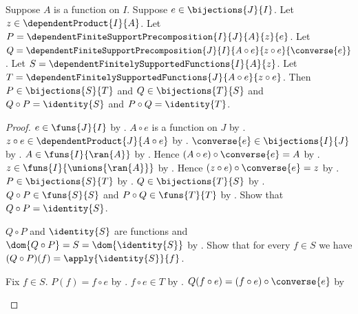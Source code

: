 \begin{theorem}\label{dependent_finite_support_bijective_precomposition_inverse}
    Suppose $A$ is a function on $I$.
    Suppose $e\in\bijections{J}{I}$.
    Let $z\in\dependentProduct{I}{A}$.
    Let $P=\dependentFiniteSupportPrecomposition{I}{J}{A}{z}{e}$.
    Let $Q=\dependentFiniteSupportPrecomposition
        {J}{I}{A\circ e}{z\circ e}{\converse{e}}$.
    Let $S=\dependentFinitelySupportedFunctions{I}{A}{z}$.
    Let $T=\dependentFinitelySupportedFunctions
        {J}{A\circ e}{z\circ e}$.
    Then
        $P\in\bijections{S}{T}$ and
        $Q\in\bijections{T}{S}$ and
        $Q\circ P=\identity{S}$ and
        $P\circ Q=\identity{T}$.
\end{theorem}
\begin{proof}
    $e\in\funs{J}{I}$ by .
    $A\circ e$ is a function on $J$ by
        .
    $z\circ e\in\dependentProduct{J}{A\circ e}$ by
        .
    $\converse{e}\in\bijections{I}{J}$ by
        .
    $A\in\funs{I}{\ran{A}}$ by
        .
    Hence $(A\circ e)\circ\converse{e}=A$ by
        .
    $z\in\funs{I}{\unions{\ran{A}}}$ by
        .
    Hence $(z\circ e)\circ\converse{e}=z$ by
        .
    $P\in\bijections{S}{T}$ by
        .
    $Q\in\bijections{T}{S}$ by
        .
    $Q\circ P\in\funs{S}{S}$ and
        $P\circ Q\in\funs{T}{T}$ by
        .
    Show that $Q\circ P=\identity{S}$.
    \begin{subproof}
        $Q\circ P$ and $\identity{S}$ are functions and
            $\dom{Q\circ P}=S=\dom{\identity{S}}$ by
            .
        Show that for every $f\in S$ we have
            $(Q\circ P)(f)=\apply{\identity{S}}{f}$.
        \begin{subproof}
            Fix $f\in S$.
            $P(f)=f\circ e$ by
                .
            $f\circ e\in T$ by
                .
            $Q(f\circ e)=(f\circ e)\circ\converse{e}$ by
\end{subproof}
\end{subproof}
\end{proof}
